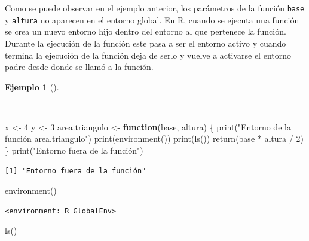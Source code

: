\documentclass[
  spanish,
  a4paper,
]{scrreport}
\newenvironment{Shaded}{\begin{snugshade}}{\end{snugshade}}
\newcommand{\ControlFlowTok}[1]{\textcolor[rgb]{0.00,0.23,0.31}{\textbf{#1}}}
\newcommand{\DecValTok}[1]{\textcolor[rgb]{0.68,0.00,0.00}{#1}}
\newcommand{\FunctionTok}[1]{\textcolor[rgb]{0.28,0.35,0.67}{#1}}
\newcommand{\NormalTok}[1]{\textcolor[rgb]{0.00,0.23,0.31}{#1}}
\newcommand{\OtherTok}[1]{\textcolor[rgb]{0.00,0.23,0.31}{#1}}
\newcommand{\SpecialCharTok}[1]{\textcolor[rgb]{0.37,0.37,0.37}{#1}}
\newcommand{\StringTok}[1]{\textcolor[rgb]{0.13,0.47,0.30}{#1}}
\theoremstyle{definition}
\theoremstyle{definition}
\newtheorem{example}{Ejemplo}[chapter]
\theoremstyle{remark}
\begin{document}
Como se puede observar en el ejemplo anterior, los parámetros de la
función \texttt{base} y \texttt{altura} no aparecen en el entorno
global. En R, cuando se ejecuta una función se crea un nuevo entorno
hijo dentro del entorno al que pertenece la función. Durante la
ejecución de la función este pasa a ser el entorno activo y cuando
termina la ejecución de la función deja de serlo y vuelve a activarse el
entorno padre desde donde se llamó a la función.

\begin{example}[]\protect\hypertarget{exm-activacion-entorno-funcion}{}\label{exm-activacion-entorno-funcion}

~

\begin{Shaded}
\begin{Highlighting}[]
\NormalTok{x }\OtherTok{\textless{}{-}} \DecValTok{4}
\NormalTok{y }\OtherTok{\textless{}{-}} \DecValTok{3}
\NormalTok{area.triangulo }\OtherTok{\textless{}{-}} \ControlFlowTok{function}\NormalTok{(base, altura) \{}
  \FunctionTok{print}\NormalTok{(}\StringTok{"Entorno de la función area.triangulo"}\NormalTok{) }
  \FunctionTok{print}\NormalTok{(}\FunctionTok{environment}\NormalTok{())}
  \FunctionTok{print}\NormalTok{(}\FunctionTok{ls}\NormalTok{())}
  \FunctionTok{return}\NormalTok{(base }\SpecialCharTok{*}\NormalTok{ altura }\SpecialCharTok{/} \DecValTok{2}\NormalTok{)}
\NormalTok{\}}
\FunctionTok{print}\NormalTok{(}\StringTok{"Entorno fuera de la función"}\NormalTok{)}
\end{Highlighting}
\end{Shaded}

\begin{verbatim}
[1] "Entorno fuera de la función"
\end{verbatim}

\begin{Shaded}
\begin{Highlighting}[]
\FunctionTok{environment}\NormalTok{()}
\end{Highlighting}
\end{Shaded}

\begin{verbatim}
<environment: R_GlobalEnv>
\end{verbatim}

\begin{Shaded}
\begin{Highlighting}[]
\FunctionTok{ls}\NormalTok{()}
\end{Highlighting}
\end{Shaded}


\end{example}
\end{document}
